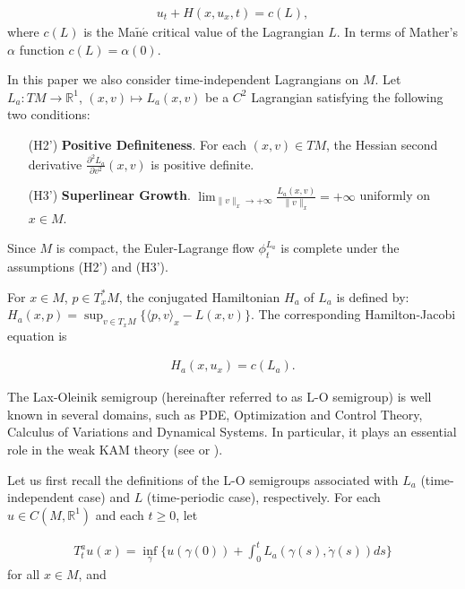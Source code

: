 \documentclass{amsart}[12pt]
\theoremstyle{definition}
\theoremstyle{remark}
\numberwithin{equation}{section}
\begin{document}
\begin{align}\label{1-1}
u_t+H(x,u_x,t)=c(L),
\end{align}
where $c(L)$ is the Ma$\mathrm{\tilde{n}}\mathrm{\acute{e}}$
critical value \cite{Man97} of the Lagrangian $L$. In terms of
Mather's $\alpha$ function $c(L)=\alpha(0)$.

In this paper we also consider time-independent Lagrangians on
$M$. Let $L_a:TM\to\mathbb{R}^1$, $(x,v)\mapsto L_a(x,v)$ be a
$C^2$ Lagrangian satisfying the following two conditions:

\vskip0.2cm
\begin{itemize}
      \item [(H2')] \textbf{Positive Definiteness}. For each $(x,v)\in TM$,
                    the Hessian second derivative $\frac{\partial^2L_a}{\partial v^2}(x,v)$
                    is positive definite.
      \item [(H3')] \textbf{Superlinear Growth}.
                    $\lim_{\|v\|_x\to+\infty}\frac{L_a(x,v)}{\|v\|_x}=+\infty$ uniformly on $x\in
                    M$.
\end{itemize}
\vskip0.2cm

Since $M$ is compact, the Euler-Lagrange flow $\phi^{L_a}_t$ is
complete under the assumptions (H2') and (H3').

For $x\in M$, $p\in T_x^*M$, the conjugated Hamiltonian $H_a$ of
$L_a$ is defined by: $H_a(x,p)=\sup_{v\in T_xM}\{\langle
p,v\rangle_x-L(x,v)\}$. The corresponding Hamilton-Jacobi equation
is

\begin{align}\label{1-2}
H_a(x,u_x)=c(L_a).
\end{align}

The Lax-Oleinik semigroup (hereinafter referred to as L-O
semigroup) \cite{Hop,Lax,Ole} is well known in several domains,
such as PDE, Optimization and Control Theory, Calculus of
Variations and Dynamical Systems. In particular, it plays an
essential role in the weak KAM theory (see
\cite{Fat1,Fat97b,Fat98a,Fat4} or \cite{Fat-b}).

Let us first recall the definitions of the L-O semigroups
associated with $L_a$ (time-independent case) and $L$
(time-periodic case), respectively. For each $u\in
C(M,\mathbb{R}^1)$ and each $t\geq0$, let

\begin{align}\label{1-3}
T^a_tu(x)=\inf_\gamma\Big\{u(\gamma(0))+\int_0^tL_a(\gamma(s),\dot{\gamma}(s))ds\Big\}
\end{align}
for all $x\in M$, and
\end{document}
